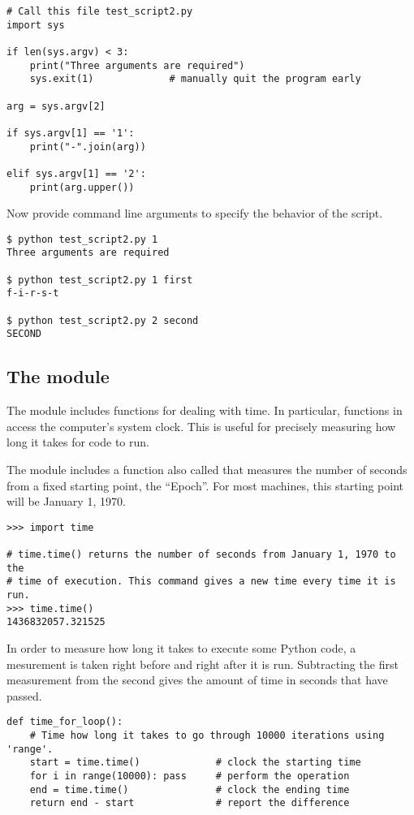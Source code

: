 \begin{lstlisting}
# Call this file test_script2.py
import sys

if len(sys.argv) < 3:
    print("Three arguments are required")
    sys.exit(1)             # manually quit the program early

arg = sys.argv[2]

if sys.argv[1] == '1':
    print("-".join(arg))

elif sys.argv[1] == '2':
    print(arg.upper())
\end{lstlisting}

Now provide command line arguments to specify the behavior of the script.

\begin{lstlisting}
$ python test_script2.py 1
Three arguments are required

$ python test_script2.py 1 first
f-i-r-s-t

$ python test_script2.py 2 second
SECOND
\end{lstlisting}

\subsection*{The  module}

The  module includes functions for dealing with time.
In particular, functions in  access the computer's system clock.
This is useful for precisely measuring how long it takes for code to run.

The  module includes a function also called  that measures the number of seconds from a fixed starting point, the ``Epoch''.
For most machines, this starting point will be January 1, 1970.

\begin{lstlisting}
>>> import time

# time.time() returns the number of seconds from January 1, 1970 to the
# time of execution. This command gives a new time every time it is run.
>>> time.time()
1436832057.321525
\end{lstlisting}

In order to measure how long it takes to execute some Python code, a mesurement is taken right before and right after it is run.
Subtracting the first measurement from the second gives the amount of time in seconds that have passed.

\begin{lstlisting}
def time_for_loop():
    # Time how long it takes to go through 10000 iterations using 'range'.
    start = time.time()             # clock the starting time
    for i in range(10000): pass     # perform the operation
    end = time.time()               # clock the ending time
    return end - start              # report the difference
\end{lstlisting}

